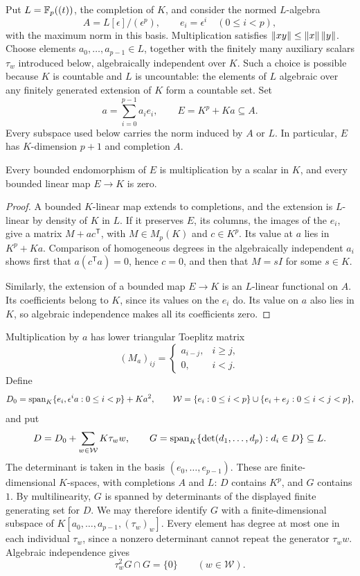 Put $L=\mathbb F_p((t))$, the completion of $K$, and consider the normed $L$\nobreakdash-algebra
\[
A=L[\epsilon]/(\epsilon^p),\qquad e_i=\epsilon^i\quad(0\le i<p),
\]
with the maximum norm in this basis. Multiplication satisfies $\lVert xy\rVert\le\lVert x\rVert\,\lVert y\rVert$.
Choose elements $a_0,\ldots,a_{p-1}\in L$, together with the finitely many auxiliary scalars
$\tau_w$ introduced below, algebraically independent over $K$. Such a choice is possible because $K$ is
countable and $L$ is uncountable: the elements of $L$ algebraic over any finitely generated extension of
$K$ form a countable set. Set
\[
a=\sum_{i=0}^{p-1}a_i e_i,\qquad E=K^p+Ka\subseteq A.
\]
Every subspace used below carries the norm induced by $A$ or $L$. In particular, $E$ has $K$\nobreakdash-dimension
$p+1$ and completion $A$.

\begin{lemma}\label{dom:rigid}
Every bounded endomorphism of $E$ is multiplication by a scalar in $K$, and every bounded linear map
$E\to K$ is zero.
\end{lemma}

\begin{proof}
A bounded $K$\nobreakdash-linear map extends to completions, and the extension is $L$\nobreakdash-linear
by density of $K$ in $L$. If it preserves $E$, its columns, the images of the $e_i$, give a matrix
$M+ac^{\mathsf T}$, with $M\in M_p(K)$ and $c\in K^p$. Its value at $a$ lies in $K^p+Ka$.
Comparison of homogeneous degrees in the algebraically independent $a_i$ shows first that
$a(c^{\mathsf T}a)=0$, hence $c=0$, and then that $M=sI$ for some $s\in K$.

Similarly, the extension of a bounded map $E\to K$ is an $L$\nobreakdash-linear functional on $A$.
Its coefficients belong to $K$, since its values on the $e_i$ do. Its value on $a$ also lies in $K$,
so algebraic independence makes all its coefficients zero.
\end{proof}

Multiplication by $a$ has lower triangular Toeplitz matrix
\[
(M_a)_{ij}=\begin{cases}a_{i-j},&i\ge j,\\0,&i<j.\end{cases}
\]
Define
\[
D_0=\operatorname{span}_K\{e_i,\epsilon^i a:0\le i<p\}+Ka^2,
\qquad
\mathcal W=\{e_i:0\le i<p\}\cup\{e_i+e_j:0\le i<j<p\},
\]
and put
\[
D=D_0+\sum_{w\in\mathcal W}K\tau_w w,\qquad
G=\operatorname{span}_K\{\det(d_1,\ldots,d_p):d_i\in D\}\subseteq L.
\]
The determinant is taken in the basis $(e_0,\ldots,e_{p-1})$. These are finite-dimensional
$K$\nobreakdash-spaces, with completions $A$ and $L$: $D$ contains $K^p$, and $G$ contains $1$.
By multilinearity, $G$ is spanned by determinants of the displayed finite generating set for $D$.
We may therefore identify $G$ with a finite-dimensional subspace of
$K[a_0,\ldots,a_{p-1},(\tau_w)_w]$. Every element has degree at most one in each individual $\tau_w$,
since a nonzero determinant cannot repeat the generator $\tau_w w$. Algebraic independence gives
\begin{equation}\label{dom:tau-gap}
\tau_w^2G\cap G=\{0\}\qquad(w\in\mathcal W).
\end{equation}

